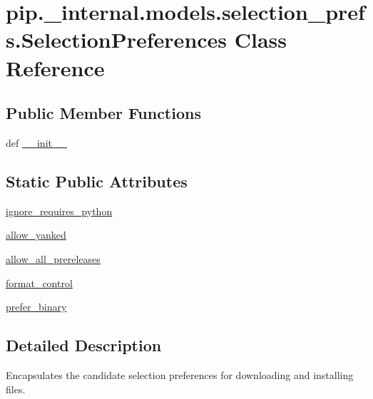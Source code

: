 \hypertarget{classpip_1_1__internal_1_1models_1_1selection__prefs_1_1SelectionPreferences}{}\section{pip.\+\_\+internal.\+models.\+selection\+\_\+prefs.\+Selection\+Preferences Class Reference}
\label{classpip_1_1__internal_1_1models_1_1selection__prefs_1_1SelectionPreferences}
\subsection*{Public Member Functions}
\begin{DoxyCompactItemize}
\item 
def \hyperlink{classpip_1_1__internal_1_1models_1_1selection__prefs_1_1SelectionPreferences_afbc7bf1374daf5ab8dbaf6d230b3b529}{\+\_\+\+\_\+init\+\_\+\+\_\+}
\end{DoxyCompactItemize}
\subsection*{Static Public Attributes}
\begin{DoxyCompactItemize}
\item 
\hyperlink{classpip_1_1__internal_1_1models_1_1selection__prefs_1_1SelectionPreferences_ab9352edcf277b94c8e28d583df35fe80}{ignore\+\_\+requires\+\_\+python}
\item 
\hyperlink{classpip_1_1__internal_1_1models_1_1selection__prefs_1_1SelectionPreferences_aa96973ab36d67714b4707eee1ea42ea6}{allow\+\_\+yanked}
\item 
\hyperlink{classpip_1_1__internal_1_1models_1_1selection__prefs_1_1SelectionPreferences_a5654189f74daa041a4be49af71e367ab}{allow\+\_\+all\+\_\+prereleases}
\item 
\hyperlink{classpip_1_1__internal_1_1models_1_1selection__prefs_1_1SelectionPreferences_abdb334388cc5baad8a777f6d6fdd26c2}{format\+\_\+control}
\item 
\hyperlink{classpip_1_1__internal_1_1models_1_1selection__prefs_1_1SelectionPreferences_a44d406c39de271606a18f520f881cbb5}{prefer\+\_\+binary}
\end{DoxyCompactItemize}


\subsection{Detailed Description}
\begin{DoxyVerb}Encapsulates the candidate selection preferences for downloading
and installing files.
\end{DoxyVerb}
 

